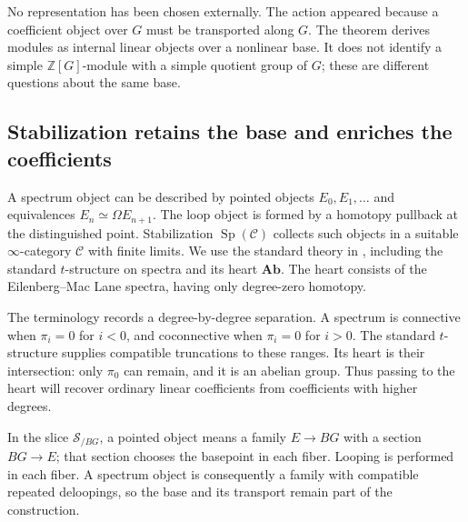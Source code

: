 \documentclass[11pt]{article}
\theoremstyle{definition}
\theoremstyle{remark}\newtheorem{remark}[theorem]{Remark}
\begin{document}
No representation has been chosen externally.  The action appeared
because a coefficient object over $G$ must be transported along $G$.
The theorem derives modules as internal linear objects over a nonlinear
base.  It does not identify a simple $\mathbb Z[G]$-module with a simple
quotient group of $G$; these are different questions about the same base.

\subsection{Stabilization retains the base and enriches the coefficients}

A spectrum object can be described by pointed objects $E_0,E_1,\ldots$
and equivalences $E_n\simeq\Omega E_{n+1}$.  The loop object is formed by
a homotopy pullback at the distinguished point.  Stabilization
$\operatorname{Sp}(\mathcal C)$ collects such objects in a suitable
$\infty$-category $\mathcal C$ with finite limits.  We use the standard
theory in \cite[\S\S1.4.2--1.4.3]{HA}, including the standard $t$-structure on
spectra and its heart $\mathbf{Ab}$.  The heart consists of the
Eilenberg--Mac Lane spectra, having only degree-zero homotopy.

The terminology records a degree-by-degree separation. A spectrum is
connective when $\pi_i=0$ for $i<0$, and coconnective when $\pi_i=0$
for $i>0$. The standard $t$-structure supplies compatible truncations
to these ranges. Its heart is their intersection: only $\pi_0$ can
remain, and it is an abelian group. Thus passing to the heart will
recover ordinary linear coefficients from coefficients with higher degrees.

In the slice $\mathcal S_{/BG}$, a pointed object means a family
$E\to BG$ with a section $BG\to E$; that section chooses the basepoint
in each fiber. Looping is performed in each fiber. A spectrum object
is consequently a family with compatible repeated deloopings, so the
base and its transport remain part of the construction.
\end{document}
